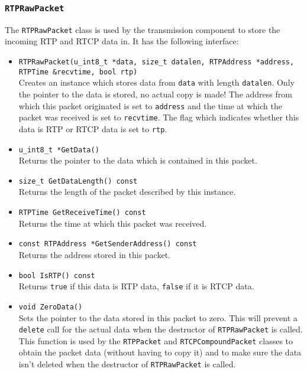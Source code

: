 \documentclass[12pt,a4paper]{article}
\newcommand{\headerfile}[1]{\marginpar{\scriptsize Header:\\{\tt #1}}}
\begin{document}
			\subsubsection{\tt RTPRawPacket}\headerfile{rtprawpacket.h}
				
				The {\tt RTPRawPacket} class is used by the transmission component
				to store the incoming RTP and RTCP data in. It has the following 
				interface:
				\begin{itemize}
					\item {\tt RTPRawPacket(u\_int8\_t *data, size\_t datalen, RTPAddress *address, RTPTime \&recvtime, bool rtp)}\\
						Creates an instance which stores data from {\tt data} with
						length {\tt datalen}. Only the pointer to the data is stored,
						no actual copy is made! The address from which this packet
						originated is set to {\tt address} and the time at which
						the packet was received is set to {\tt recvtime}. The flag
						which indicates whether this data is RTP or RTCP data is set
						to {\tt rtp}.
					\item {\tt u\_int8\_t *GetData()}\\
						Returns the pointer to the data which is contained in this
						packet.
					\item {\tt size\_t GetDataLength() const}\\
						Returns the length of the packet described by this instance.
					\item {\tt RTPTime GetReceiveTime() const}\\
						Returns the time at which this packet was received.
					\item {\tt const RTPAddress *GetSenderAddress() const}\\
						Returns the address stored in this packet.
					\item {\tt bool IsRTP() const}\\
						Returns {\tt true} if this data is RTP data, {\tt false} if it is RTCP
						data.
					\item {\tt void ZeroData()}\\
						Sets the pointer to the data stored in this packet to zero.
						This will prevent a {\tt delete} call for the actual data when
						the destructor of {\tt RTPRawPacket} is called. This function
						is used by the {\tt RTPPacket} and {\tt RTCPCompoundPacket}
						classes to obtain the packet data (without having to copy it)
						and to make sure the data isn't deleted when the destructor
						of {\tt RTPRawPacket} is called.
				\end{itemize}
\end{document}
